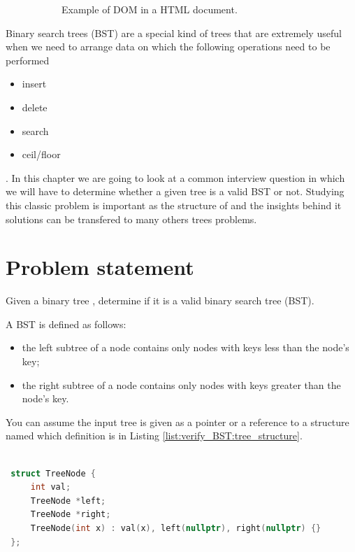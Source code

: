 \begin{figure}
\begin{subfigure}[t]{0.46\textwidth}
		\caption[]{Example of DOM in a HTML document.}
		\label{fig:verify:DOM}
	 \end{subfigure}
	 \caption[]{}
	  \label{fig:verify:trees}
\end{figure}



Binary search trees (BST) are a special kind of trees that are extremely useful when we need to arrange data on which the following operations need to be performed
\begin{itemize}
	\item insert
	\item delete
	\item search
	\item ceil/floor
\end{itemize}.
In this chapter we are going to look at a common interview question in which we will have to determine whether a given tree is a valid BST or not. 
Studying this classic problem is important as the structure of and the insights behind it solutions can be transfered to many others trees problems.

\section{Problem statement}
\begin{exercise}
Given a binary tree \cite{cit:wiki:BST}, determine if it is a valid binary search tree (BST).

A BST is defined as follows:
\begin{itemize}
    \item the left subtree of a node contains only nodes with keys less than the node's key;
    \item the right subtree of a node contains only nodes with keys greater than the node's key.
\end{itemize}
You can assume the input tree is given as a pointer or a reference to a structure named  which definition is in Listing \ref{list:verify_BST:tree_structure}. 

\end{exercise}

\begin{lstlisting}[language=c++, caption=Binary tree definition used in this exercice.,label=list:verify_BST:tree_structure]

 struct TreeNode {
     int val;
     TreeNode *left;
     TreeNode *right;
     TreeNode(int x) : val(x), left(nullptr), right(nullptr) {}
 };
 \end{lstlisting}


